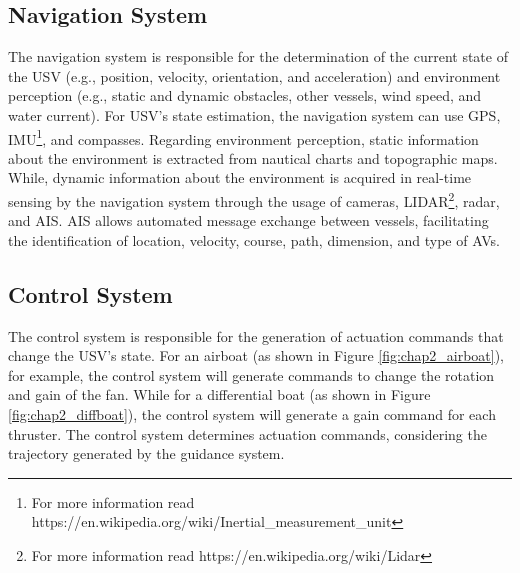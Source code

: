     \subsection{Navigation System}
    
    The navigation system is responsible for the determination of the current state of the \ac{USV} (e.g., position, velocity, orientation, and acceleration) and environment perception (e.g., static and dynamic obstacles, other vessels, wind speed, and water current). For \ac{USV}'s state estimation, the navigation system can use GPS, \ac{IMU}\footnote{For more information read https://en.wikipedia.org/wiki/Inertial\_measurement\_unit}, and compasses. Regarding environment perception, static information about the environment is extracted from nautical charts and topographic maps. While, dynamic information about the environment is acquired in real-time sensing by the navigation system through the usage of cameras, \ac{LIDAR}\footnote{For more information read https://en.wikipedia.org/wiki/Lidar}, radar, and \ac{AIS}. \ac{AIS} allows automated message exchange between vessels, facilitating the identification of location, velocity, course, path, dimension, and type of \acp{AV}.
    
    \subsection{Control System}
    The control system is responsible for the generation of actuation commands that change the \ac{USV}'s state. For an airboat (as shown in Figure \ref{fig:chap2_airboat}), for example, the control system will generate commands to change the rotation and gain of the fan. While for a differential boat (as shown in Figure \ref{fig:chap2_diffboat}), the control system will generate a gain command for each thruster. The control system determines actuation commands, considering the trajectory generated by the guidance system.
    
